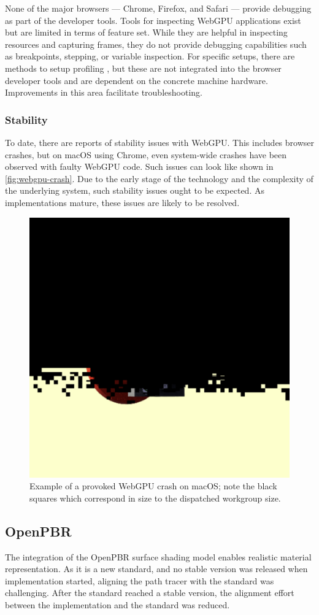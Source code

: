 None of the major browsers — Chrome, Firefox, and Safari — provide debugging as part of the developer tools. Tools for inspecting \gls{WebGPU} applications exist \cite{webGpuDevToolsDuncan, webGpuDevToolsTakahiro} but are limited in terms of feature set. While they are helpful in inspecting resources and capturing frames, they do not provide debugging capabilities such as breakpoints, stepping, or variable inspection. For specific setups, there are methods to setup profiling \cite{webGpuProfilingWithPix}, but these are not integrated into the browser developer tools and are dependent on the concrete machine hardware. Improvements in this area facilitate troubleshooting.

\subsubsection*{Stability}

To date, there are reports of stability issues with \gls{WebGPU}. This includes browser crashes, but on macOS using Chrome, even system-wide crashes have been observed with faulty \gls{WebGPU} code. Such issues can look like shown in \autoref{fig:webgpu-crash}. Due to the early stage of the technology and the complexity of the underlying system, such stability issues ought to be expected. As implementations mature, these issues are likely to be resolved.

\begin{figure}[H]
  \centering
  \includegraphics[width=0.3\columnwidth]{resources/webgpu-crashes.png}
  \caption{Example of a provoked \gls{WebGPU} crash on macOS; note the black squares which correspond in size to the dispatched workgroup size.}
  \label{fig:webgpu-crash}
\end{figure}

\subsection*{OpenPBR}

The integration of the \gls{OpenPBR} surface shading model enables realistic material representation. As it is a new standard, and no stable version was released when implementation started, aligning the path tracer with the standard was challenging. After the standard reached a stable version, the alignment effort between the implementation and the standard was reduced.

